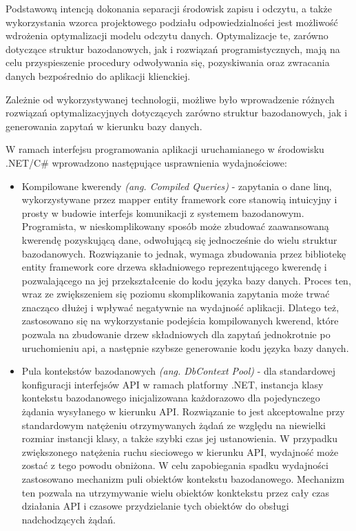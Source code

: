 Podstawową intencją dokonania separacji środowisk zapisu i odczytu, a także wykorzystania wzorca projektowego podziału odpowiedzialności jest możliwość wdrożenia optymalizacji modelu odczytu danych. Optymalizacje te, zarówno dotyczące struktur bazodanowych, jak i rozwiązań programistycznych, mają na celu przyspieszenie procedury odwoływania się, pozyskiwania oraz zwracania danych bezpośrednio do aplikacji klienckiej.  

Zależnie od wykorzystywanej technologii, możliwe było wprowadzenie różnych rozwiązań optymalizacyjnych dotyczących zarówno struktur bazodanowych, jak i generowania zapytań w kierunku bazy danych.

W ramach interfejsu programowania aplikacji uruchamianego w środowisku .NET/C\# wprowadzono następujące usprawnienia wydajnościowe:
\begin{itemize}
    \item Kompilowane kwerendy \textit{(ang. Compiled Queries)} - zapytania o dane linq, wykorzystywane przez mapper entity framework core stanowią intuicyjny i prosty w budowie interfejs komunikacji z systemem bazodanowym. Programista, w nieskomplikowany sposób może zbudować zaawansowaną kwerendę pozyskującą dane, odwołującą się jednocześnie do wielu struktur bazodanowych. Rozwiązanie to jednak, wymaga zbudowania przez bibliotekę entity framework core drzewa składniowego reprezentującego kwerendę i pozwalającego na jej przekształcenie do kodu języka bazy danych. Proces ten, wraz ze zwiększeniem się poziomu skomplikowania zapytania może trwać znacząco dłużej i wpływać negatywnie na wydajność aplikacji. Dlatego też, zastosowano się na wykorzystanie podejścia kompilowanych kwerend, które pozwala na zbudowanie drzew składniowych dla zapytań jednokrotnie po uruchomieniu api, a następnie szybsze generowanie kodu języka bazy danych.
    \item Pula kontekstów bazodanowych \textit{(ang. DbContext Pool)} - dla standardowej konfiguracji interfejsów API w ramach platformy .NET, instancja klasy kontekstu bazodanowego inicjalizowana każdorazowo dla pojedynczego żądania wysyłanego w kierunku API. Rozwiązanie to jest akceptowalne przy standardowym natężeniu otrzymywanych żądań ze względu na niewielki rozmiar instancji klasy, a także szybki czas jej ustanowienia. W przypadku zwiększonego natężenia ruchu sieciowego w kierunku API, wydajność może zostać z tego powodu obniżona. W celu zapobiegania spadku wydajności zastosowano mechanizm puli obiektów kontekstu bazodanowego. Mechanizm ten pozwala na utrzymywanie wielu obiektów konktekstu przez cały czas działania API i czasowe przydzielanie tych obiektów do obsługi nadchodzących żądań.

\end{itemize}
